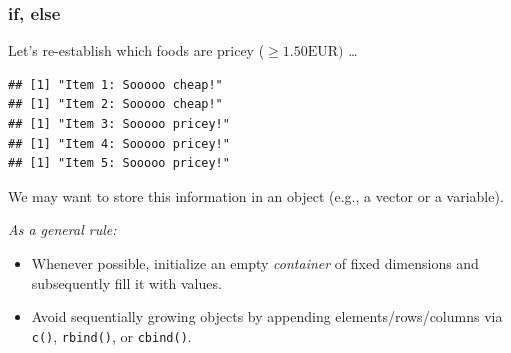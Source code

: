 \documentclass[
  11pt,
]{article}
\newenvironment{Shaded}{\begin{snugshade}}{\end{snugshade}}
\newcommand{\ControlFlowTok}[1]{\textcolor[rgb]{0.13,0.29,0.53}{\textbf{#1}}}
\newcommand{\FloatTok}[1]{\textcolor[rgb]{0.00,0.00,0.81}{#1}}
\newcommand{\FunctionTok}[1]{\textcolor[rgb]{0.00,0.00,0.00}{#1}}
\newcommand{\NormalTok}[1]{#1}
\newcommand{\SpecialCharTok}[1]{\textcolor[rgb]{0.00,0.00,0.00}{#1}}
\newcommand{\StringTok}[1]{\textcolor[rgb]{0.31,0.60,0.02}{#1}}
\providecommand{\tightlist}{%
  \setlength{\itemsep}{0pt}\setlength{\parskip}{0pt}}
\begin{document}
\hypertarget{if-else}{%
\subsubsection{if, else}\label{if-else}}

Let's re-establish which foods are pricey (\(\geq 1.50\text{EUR})\) \ldots{}

\begin{Shaded}
\end{Shaded}

\begin{verbatim}
## [1] "Item 1: Sooooo cheap!"
## [1] "Item 2: Sooooo cheap!"
## [1] "Item 3: Sooooo pricey!"
## [1] "Item 4: Sooooo pricey!"
## [1] "Item 5: Sooooo pricey!"
\end{verbatim}

We may want to store this information in an object (e.g., a vector or a variable).

\emph{As a general rule:}

\begin{itemize}
\tightlist
\item
  Whenever possible, initialize an empty \emph{container} of fixed dimensions and subsequently fill it with values.
\item
  Avoid sequentially growing objects by appending elements/rows/columns via \texttt{c()}, \texttt{rbind()}, or \texttt{cbind()}.
\end{itemize}
\end{document}
